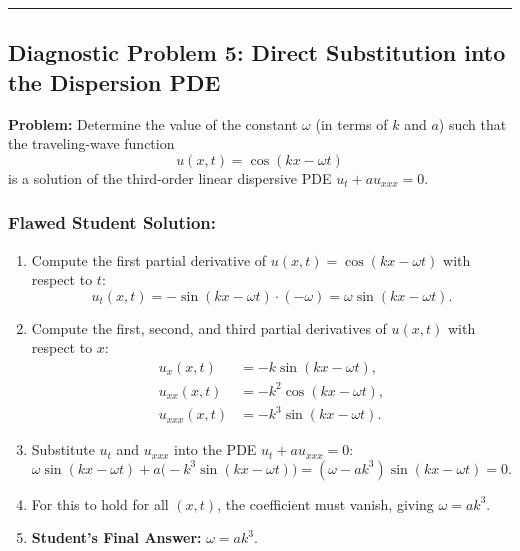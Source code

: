 \documentclass[11pt,a4paper]{article}
\begin{document}
\bigskip
\hrule
\bigskip

\subsection*{Diagnostic Problem 5: Direct Substitution into the Dispersion PDE}
\textbf{Problem:} Determine the value of the constant $\omega$ (in terms of $k$ and $a$) such that the traveling-wave function
\[
    u(x, t) = \cos(kx - \omega t)
\]
is a solution of the third-order linear dispersive PDE $u_t + a u_{xxx} = 0$.

\subsubsection*{Flawed Student Solution:}
\begin{enumerate}
    \item Compute the first partial derivative of $u(x, t) = \cos(kx - \omega t)$ with respect to $t$:
    \[
        u_t(x, t) = -\sin(kx - \omega t)\cdot (-\omega) = \omega \sin(kx - \omega t).
    \]
    \item Compute the first, second, and third partial derivatives of $u(x, t)$ with respect to $x$:
    \begin{align*}
        u_x(x, t) &= -k\sin(kx - \omega t), \\
        u_{xx}(x, t) &= -k^2\cos(kx - \omega t), \\
        u_{xxx}(x, t) &= -k^3\sin(kx - \omega t).
    \end{align*}
    \item Substitute $u_t$ and $u_{xxx}$ into the PDE $u_t + a u_{xxx} = 0$:
    \[
        \omega \sin(kx - \omega t) + a\big(-k^3\sin(kx - \omega t)\big) = (\omega - a k^3)\sin(kx - \omega t) = 0.
    \]
    \item For this to hold for all $(x, t)$, the coefficient must vanish, giving $\omega = a k^3$.
    \item \textbf{Student's Final Answer:} $\omega = a k^3$.
\end{enumerate}
\end{document}
